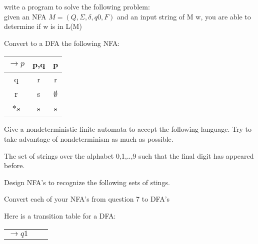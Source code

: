\documentclass{exam}
\begin{document}
\begin{questions}
  \question
  write a program to solve the following problem:\\
  given an NFA $M = (Q, \Sigma, \delta, q0, F)$ and an input string of
  M w, you are able to determine if w is in L(M)

  \question
  Convert to a DFA the following NFA:
  \begin{center}
    \begin{tabular}{c|c|c}
      $\rightarrow p$&{p,q}&{p}\\
      \hline
      q&{r}&{r}\\
      r&{s}&$\emptyset$\\
      $*s$&{s}&{s}
    \end{tabular}
  \end{center}

  \question
  Give a nondeterministic finite automata to accept the following
  language. Try to take advantage of nondeterminism as much as possible.
  \begin{center}
    The set of strings over the alphabet {0,1,..,9} such that the final
    digit has appeared before.
  \end{center}

  \question
  Design NFA's to recognize the following sets of stings.

  \question
  Convert each of your NFA's from question 7 to DFA's

  \question
  Here is a transition table for a DFA:
  \begin{center}
    \begin{tabular}{c|c|c}
      $\rightarrow q1$
    \end{tabular}
  \end{center}

\end{questions}
\end{document}
